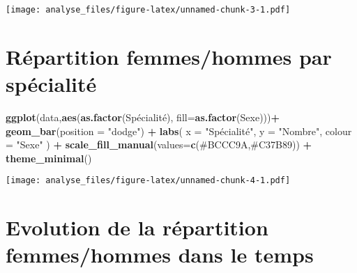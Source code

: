 \documentclass[
]{article}
\newenvironment{Shaded}{\begin{snugshade}}{\end{snugshade}}
\newcommand{\DataTypeTok}[1]{\textcolor[rgb]{0.13,0.29,0.53}{#1}}
\newcommand{\KeywordTok}[1]{\textcolor[rgb]{0.13,0.29,0.53}{\textbf{#1}}}
\newcommand{\NormalTok}[1]{#1}
\newcommand{\OperatorTok}[1]{\textcolor[rgb]{0.81,0.36,0.00}{\textbf{#1}}}
\newcommand{\StringTok}[1]{\textcolor[rgb]{0.31,0.60,0.02}{#1}}
\begin{document}
\texttt{[image: analyse\_files/figure-latex/unnamed-chunk-3-1.pdf]}

\hypertarget{ruxe9partition-femmeshommes-par-spuxe9cialituxe9}{%
\section{Répartition femmes/hommes par
spécialité}\label{ruxe9partition-femmeshommes-par-spuxe9cialituxe9}}

\begin{Shaded}
\begin{Highlighting}[]
 \KeywordTok{ggplot}\NormalTok{(data,}\KeywordTok{aes}\NormalTok{(}\KeywordTok{as.factor}\NormalTok{(Spécialité), }\DataTypeTok{fill=}\KeywordTok{as.factor}\NormalTok{(Sexe)))}\OperatorTok{+}
\StringTok{        }\KeywordTok{geom\_bar}\NormalTok{(}\DataTypeTok{position =} \StringTok{"dodge"}\NormalTok{) }\OperatorTok{+}
\StringTok{        }\KeywordTok{labs}\NormalTok{(}
          \DataTypeTok{x =} \StringTok{"Spécialité"}\NormalTok{,}
          \DataTypeTok{y =} \StringTok{"Nombre"}\NormalTok{,}
          \DataTypeTok{colour =} \StringTok{"Sexe"}
\NormalTok{        ) }\OperatorTok{+}
\StringTok{        }\KeywordTok{scale\_fill\_manual}\NormalTok{(}\DataTypeTok{values=}\KeywordTok{c}\NormalTok{(}\StringTok{\textquotesingle{}\#BCCC9A\textquotesingle{}}\NormalTok{,}\StringTok{\textquotesingle{}\#C37B89\textquotesingle{}}\NormalTok{)) }\OperatorTok{+}
\StringTok{        }\KeywordTok{theme\_minimal}\NormalTok{()}
\end{Highlighting}
\end{Shaded}

\texttt{[image: analyse\_files/figure-latex/unnamed-chunk-4-1.pdf]}

\hypertarget{evolution-de-la-ruxe9partition-femmeshommes-dans-le-temps}{%
\section{Evolution de la répartition femmes/hommes dans le
temps}\label{evolution-de-la-ruxe9partition-femmeshommes-dans-le-temps}}
\end{document}

